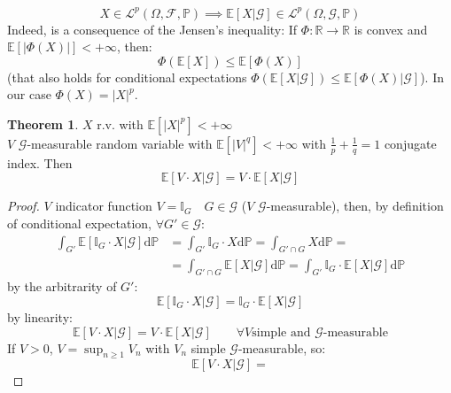 \documentclass[10pt,a4paper]{article}
\theoremstyle{definition}
\newtheorem{teo}{Theorem}[section]
\begin{document}
\begin{enumerate}
\begin{equation*}
	X \in \mathcal{L}^p(\Omega,\mathcal{F},\mathbb{P})\implies \mathbb{E}[X|\mathcal{G}]\in \mathcal{L}^p(\Omega,\mathcal{G},\mathbb{P})
\end{equation*}
Indeed, is a consequence of the Jensen's inequality:
If $\Phi : \mathbb{R}\to\mathbb{R}$ is convex and $\mathbb{E}[|\Phi(X)|]<+\infty $, then:
\begin{equation*}
\Phi(\mathbb{E}[X])\leq\mathbb{E}[\Phi(X)]
\end{equation*}
(that also holds for conditional expectations $\Phi(\mathbb{E}[X|\mathcal{G}])\leq\mathbb{E}[\Phi(X)|\mathcal{G}]$). In our case $ \Phi(X)=|X|^p$.
\begin{teo}
	$X$ r.v. with $\mathbb{E}[|X|^p]<+\infty $\\
	$V$ $\mathcal{G}$-measurable random variable with $\mathbb{E}[|V|^q]<+\infty$ with $\frac{1}{p}+\frac{1}{q}=1$ conjugate index.
	Then
	\begin{equation*}
		\mathbb{E}[V\cdot X|\mathcal{G}]=V\cdot \mathbb{E}[X|\mathcal{G}]
	\end{equation*}
\end{teo}
\begin{proof}
	$V$ indicator function $V=\mathbb{I}_G \quad G\in\mathcal{G}$ ($V$ $\mathcal{G}$-measurable), then, by definition of conditional expectation, $\forall G'\in \mathcal{G}$:
\begin{equation*}
	\begin{split}
		\int_{G'}\mathbb{E}[\mathbb{I}_G \cdot X|\mathcal{G}]\mathrm{d}\mathbb{P}&=
		\int_{G'}\mathbb{I}_G \cdot X\mathrm{d}\mathbb{P}=
		\int_{G'\cap G}X\mathrm{d}\mathbb{P}=\\
		&=\int_{G'\cap G}\mathbb{E}[X|\mathcal{G}]\mathrm{d}\mathbb{P}=
		\int_{G'}\mathbb{I}_G \cdot\mathbb{E}[ X|\mathcal{G}]\mathrm{d}\mathbb{P}
	\end{split}
\end{equation*}
by the arbitrarity of $G'$: 
	\begin{equation*}
	\mathbb{E}[\mathbb{I}_G\cdot X|\mathcal{G}]=\mathbb{I}_G\cdot \mathbb{E}[X|\mathcal{G}]
\end{equation*}
by linearity:
\begin{equation*}
	\mathbb{E}[V\cdot X|\mathcal{G}]=V\cdot \mathbb{E}[X|\mathcal{G}] \qquad\forall V \text{simple and  $\mathcal{G}$-measurable}  
\end{equation*} 
If $V>0$, $V=\sup_{n\geq 1}V_n$ with $V_n$ simple   $\mathcal{G}$-measurable, so:
\begin{equation*}
	\mathbb{E}[V\cdot X|\mathcal{G}]=

\end{equation*}
\end{proof}
\end{enumerate}
\end{document}
